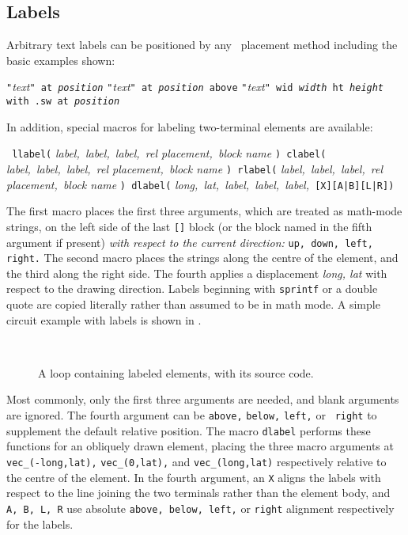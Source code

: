 \subsection{Labels\label{Labels:}}
   Arbitrary text labels
   can be positioned by any \pic\ placement method including the
   basic examples shown:

   {\tt "}{\sl text}{\tt" at {\sl position}}\NVL
   {\tt "}{\sl text}{\tt" at {\sl position} above}\NVL
   {\tt "}{\sl text}{\tt" wid {\sl width} ht {\sl height} 
     with .sw at {\sl position}}\NVL

   In addition, special macros for labeling two-terminal elements are available:
\par
{\tt
   llabel(} {\sl label,\ label,\ label,\ rel placement,\ block name} {\tt )
      \hfill\break\hspace*{\parindent}%
   clabel(} {\sl label,\ label,\ label,\ rel placement,\ block name} {\tt )
      \hfill\break\hspace*{\parindent}%
   rlabel(} {\sl label,\ label,\ label,\ rel placement,\ block name} {\tt )
      \hfill\break\hspace*{\parindent}%
   dlabel(} {\sl long,\ lat,\ label,\ label,\ label,\ }{\tt[X][A|B][L|R])}

The first macro places the first three arguments, which are treated
as math-mode strings, on the left side of the last {\tt []} block (or
the block named in the fifth argument if present) {\em with respect to
the current direction:} {\tt up, down, left, right.} The second macro
places the strings along the centre of the element, and the third along
the right side.  The fourth applies a displacement {\sl long, lat} with
respect to the drawing direction.  Labels beginning with {\tt sprintf}
or a double quote are copied literally rather than assumed to be in
math mode.  A simple circuit example with labels is shown in .
\begin{figure}[H]
   \vspace*{-\baselineskip}
   \parbox{4in}{\small }%
   \hfill\raise-0.5in\hbox{ }
   \vspace*{-\baselineskip}
   \caption{A loop containing labeled elements, with its source code.}
   \label{Loop}
   \end{figure}
Most commonly, only
the first three arguments are needed, and blank arguments are ignored.
The fourth argument can be {\tt above,} {\tt below,} {\tt left,} or {\tt
right} to supplement the default relative position.
The macro {\tt dlabel} performs these functions for an
obliquely drawn element, placing the three macro arguments at
{\tt vec\_(-long,lat),} {\tt vec\_(0,lat),} and {\tt vec\_(long,lat)}
respectively relative to the centre of the element.
In the fourth argument, an {\tt X} aligns the labels with respect to the line
joining the two terminals rather than the element body, and
{\tt A, B, L, R} use absolute {\tt above, below, left,} or {\tt right} alignment
respectively for the labels.

